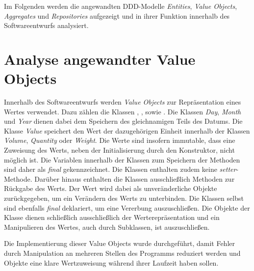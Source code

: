 Im Folgenden werden die angewandten \ac{DDD}-Modelle \textit{Entities}, \textit{Value Objects}, \textit{Aggregates} und \textit{Repositories} aufgezeigt und in ihrer Funktion innerhalb des Softwareentwurfs analysiert.

\section{Analyse angewandter Value Objects}
\label{domaindrivendesign>valueobjects}
Innerhalb des Softwareentwurfs werden \textit{Value Objects} zur Repräsentation eines Wertes verwendet.
Dazu zählen die Klassen \href{}{}, \href{}{}, \href{}{} sowie \href{}{}.
Die Klassen \href{}{\code{}}\textit{Day}, \href{}{\code{}}\textit{Month} und \href{}{\code{}}\textit{Year} dienen dabei dem Speichern des gleichnamigen Teils des Datums.
Die Klasse \href{}{\code{}}\textit{Value} speichert den Wert der dazugehörigen Einheit innerhalb der Klassen \href{}{\code{}}\textit{Volume}, \href{}{\code{}}\textit{Quantity} oder \href{}{\code{}}\textit{Weight}.
Die Werte sind insofern immutable, dass eine Zuweisung des Werts, neben der Initialisierung durch den Konstruktor, nicht möglich ist.
Die Variablen innerhalb der Klassen zum Speichern der Methoden sind daher als \textit{final} gekennzeichnet.
Die Klassen enthalten zudem keine \textit{setter}-Methode.
Darüber hinaus enthalten die Klassen ausschließlich Methoden zur Rückgabe des Werts.
Der Wert wird dabei als unveränderliche Objekte zurückgegeben, um ein Verändern des Werts zu unterbinden.
Die Klassen selbst sind ebenfalls \textit{final} deklariert, um eine Vererbung auszuschließen.
Die Objekte der Klasse dienen schließlich ausschließlich der Werterepräsentation und ein Manipulieren des Wertes, auch durch Subklassen, ist auszuschließen.

Die Implementierung dieser Value Objects wurde durchgeführt, damit Fehler durch Manipulation an mehreren Stellen des Programms reduziert werden und Objekte eine klare Wertzuweisung während ihrer Laufzeit haben sollen.

